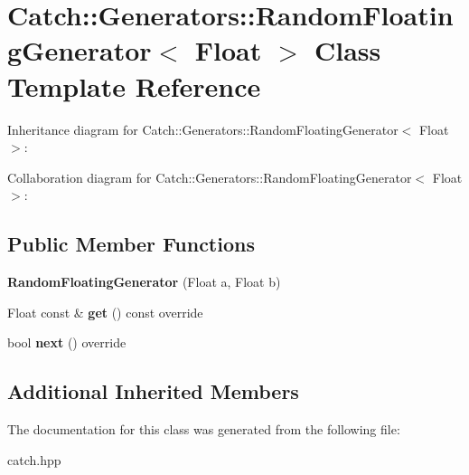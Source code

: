 \hypertarget{classCatch_1_1Generators_1_1RandomFloatingGenerator}{}\section{Catch\+:\+:Generators\+:\+:Random\+Floating\+Generator$<$ Float $>$ Class Template Reference}
\label{classCatch_1_1Generators_1_1RandomFloatingGenerator}


Inheritance diagram for Catch\+:\+:Generators\+:\+:Random\+Floating\+Generator$<$ Float $>$\+:


Collaboration diagram for Catch\+:\+:Generators\+:\+:Random\+Floating\+Generator$<$ Float $>$\+:
\subsection*{Public Member Functions}
\begin{DoxyCompactItemize}
\item 
\mbox{\label{classCatch_1_1Generators_1_1RandomFloatingGenerator_abce275ce88f7c3465addd7a98b6c408d}} 
{\bfseries Random\+Floating\+Generator} (Float a, Float b)
\item 
\mbox{\label{classCatch_1_1Generators_1_1RandomFloatingGenerator_a0dea6fa1f9e2647df022f0b588cf0a8f}} 
Float const  \& {\bfseries get} () const override
\item 
\mbox{\label{classCatch_1_1Generators_1_1RandomFloatingGenerator_a6a65e5f16abd884f58c31581b2a0d6db}} 
bool {\bfseries next} () override
\end{DoxyCompactItemize}
\subsection*{Additional Inherited Members}


The documentation for this class was generated from the following file\+:\begin{DoxyCompactItemize}
\item 
catch.\+hpp\end{DoxyCompactItemize}
